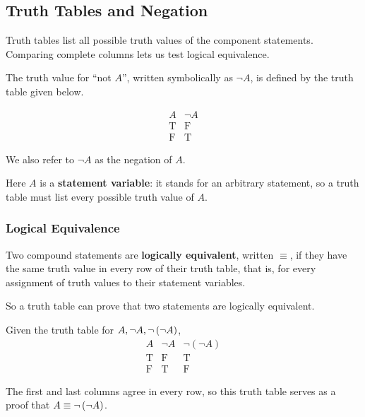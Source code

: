 \subsection{Truth Tables and Negation}
Truth tables list all possible truth values of the component statements.
Comparing complete columns lets us test logical equivalence.
\begin{definition}[Negation]
    The truth value for ``not $A$'', written symbolically as $\neg A$, is defined by the truth table given below.

    \[
    \begin{array}{c|c}
    A & \neg A \\
    \hline
    \mathrm{T} & \mathrm{F} \\
    \mathrm{F} & \mathrm{T}
    \end{array}
    \]

    We also refer to $\neg A$ as the negation of $A$. 
\end{definition}

Here $A$ is a \textbf{statement variable}: it stands for an arbitrary statement, so a truth table
must list every possible truth value of $A$.

\subsubsection{Logical Equivalence}
\begin{definition}
    Two compound statements are \textbf{logically equivalent}, written $\equiv$, if they have the
    same truth value in every row of their truth table, that is, for every assignment of truth values
    to their statement variables.
\end{definition}

So a truth table can prove that two statements are logically equivalent.

\begin{example}
    Given the truth table for $A, \neg A, \neg \left(\neg A\right)$, 
    \[
        \begin{array}{c|c|c}
        A & \neg A & \neg(\neg A) \\
        \hline
        \mathrm{T} & \mathrm{F} & \mathrm{T} \\
        \mathrm{F} & \mathrm{T} & \mathrm{F}
        \end{array}
    \]

    The first and last columns agree in every row, so this truth table serves as a proof that $A \equiv \neg \left(\neg A\right)$.
\end{example}

